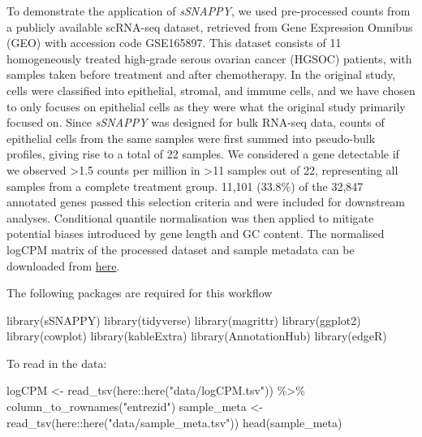 \documentclass[9pt,a4paper,]{extarticle}
\newenvironment{Shaded}{\begin{snugshade}}{\end{snugshade}}
\newcommand{\FunctionTok}[1]{\textcolor[rgb]{0.00,0.00,0.00}{#1}}
\newcommand{\NormalTok}[1]{#1}
\newcommand{\OtherTok}[1]{\textcolor[rgb]{0.56,0.35,0.01}{#1}}
\newcommand{\SpecialCharTok}[1]{\textcolor[rgb]{0.00,0.00,0.00}{#1}}
\newcommand{\StringTok}[1]{\textcolor[rgb]{0.31,0.60,0.02}{#1}}
\begin{document}
To demonstrate the application of \emph{sSNAPPY}, we used pre-processed counts from a publicly available scRNA-seq dataset, retrieved from Gene Expression Omnibus (GEO) with accession code GSE165897.
This dataset consists of 11 homogeneously treated high-grade serous ovarian cancer (HGSOC) patients, with samples taken before treatment and after chemotherapy\citep{Zhang2022}.
In the original study, cells were classified into epithelial, stromal, and immune cells, and we have chosen to only focuses on epithelial cells as they were what the original study primarily focused on.
Since \emph{sSNAPPY} was designed for bulk RNA-seq data, counts of epithelial cells from the same samples were first summed into pseudo-bulk profiles, giving rise to a total of 22 samples.
We considered a gene detectable if we observed \textgreater1.5 counts per million in \textgreater11 samples out of 22, representing all samples from a complete treatment group.
11,101 (33.8\%) of the 32,847 annotated genes passed this selection criteria and were included for downstream analyses.
Conditional quantile normalisation\citep{Hansen2012} was then applied to mitigate potential biases introduced by gene length and GC content.
The normalised logCPM matrix of the processed dataset and sample metadata can be downloaded from \href{https://github.com/Wenjun-Liu/F1000_sSNAPPY_manuscript/tree/master/data}{here}.

The following packages are required for this workflow

\begin{Shaded}
\begin{Highlighting}[]
\FunctionTok{library}\NormalTok{(sSNAPPY)}
\FunctionTok{library}\NormalTok{(tidyverse)}
\FunctionTok{library}\NormalTok{(magrittr)}
\FunctionTok{library}\NormalTok{(ggplot2)}
\FunctionTok{library}\NormalTok{(cowplot)}
\FunctionTok{library}\NormalTok{(kableExtra)}
\FunctionTok{library}\NormalTok{(AnnotationHub) }
\FunctionTok{library}\NormalTok{(edgeR)}
\end{Highlighting}
\end{Shaded}

To read in the data:

\begin{Shaded}
\begin{Highlighting}[]
\NormalTok{logCPM }\OtherTok{\textless{}{-}} \FunctionTok{read\_tsv}\NormalTok{(here}\SpecialCharTok{::}\FunctionTok{here}\NormalTok{(}\StringTok{"data/logCPM.tsv"}\NormalTok{)) }\SpecialCharTok{\%\textgreater{}\%}
    \FunctionTok{column\_to\_rownames}\NormalTok{(}\StringTok{"entrezid"}\NormalTok{)}
\NormalTok{sample\_meta }\OtherTok{\textless{}{-}} \FunctionTok{read\_tsv}\NormalTok{(here}\SpecialCharTok{::}\FunctionTok{here}\NormalTok{(}\StringTok{"data/sample\_meta.tsv"}\NormalTok{))}
\FunctionTok{head}\NormalTok{(sample\_meta)}
\end{Highlighting}
\end{Shaded}
\end{document}
